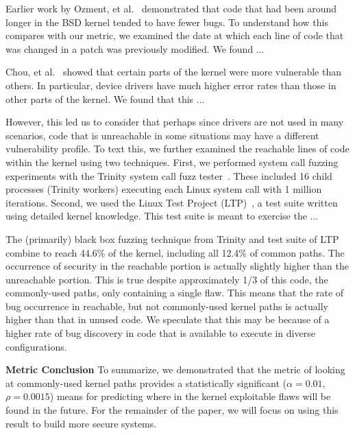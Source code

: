 Earlier work by Ozment, et al.~\cite{ozment2006milk} demonstrated that code that
had been around longer in the BSD kernel tended to have fewer bugs.  To
understand how this compares with our metric, we examined the date at which
each line of code that was changed in a patch was previously modified.  We
found ...



Chou, et al.~\cite{PittSFIeld} showed that certain parts of the kernel
were more vulnerable than others. In particular, device drivers have 
much higher error rates than those in other parts of the kernel.
We found that this ...


However, this led us to consider that perhaps since drivers are not used
in many scenarios, code that is unreachable in some situations may have a 
different vulnerability profile.  To text this, we 
further examined the reachable lines of 
code within the kernel using two techniques.  First, 
we performed system call fuzzing experiments with the Trinity
system call fuzz tester~\cite{Trinity}. These included 16 child processes
(Trinity workers) executing each Linux system call with 1 million iterations.
Second, we used the Linux Test Project (LTP)~\cite{LTP}, a test suite written
using detailed kernel knowledge.  This test suite is meant to exercise the ...

The (primarily) black box fuzzing technique from Trinity and test suite of
LTP combine to reach 44.6\% of the kernel, including all 12.4\% of common
paths.  The occurrence of security in the reachable portion is actually 
slightly higher than the unreachable portion.  This is true despite
approximately 1/3 of this code, the commonly-used paths, only containing
a single flaw.  This means that the rate of bug occurrence in reachable, but
not commonly-used kernel paths is actually higher than that in unused
code.  We speculate that this may be because of a higher rate of bug discovery
in code that is available to execute in diverse configurations.


\textbf{Metric Conclusion}
To summarize, we demonstrated that the metric of looking at commonly-used
kernel paths provides a statistically significant ($\alpha=0.01$, 
$\rho=0.0015$) means for predicting where in the kernel exploitable flaws 
will be found in the future.  For the remainder of the paper, we will 
focus on using this result to build more secure systems.


